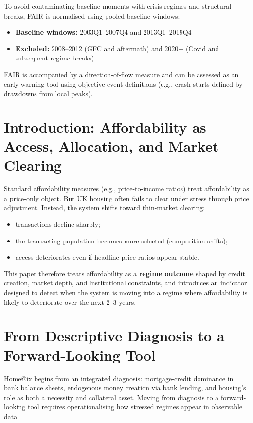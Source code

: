 \documentclass[11pt,a4paper]{article}
\begin{document}
To avoid contaminating baseline moments with crisis regimes and structural breaks, FAIR is normalised using pooled baseline windows:
\begin{itemize}
  \item \textbf{Baseline windows:} 2003Q1--2007Q4 and 2013Q1--2019Q4
  \item \textbf{Excluded:} 2008--2012 (GFC and aftermath) and 2020+ (Covid and subsequent regime breaks)
\end{itemize}

FAIR is accompanied by a direction-of-flow measure and can be assessed as an early-warning tool using objective event definitions (e.g., crash starts defined by drawdowns from local peaks).

\section{Introduction: Affordability as Access, Allocation, and Market Clearing}
Standard affordability measures (e.g., price-to-income ratios) treat affordability as a price-only object. But UK housing often fails to clear under stress through price adjustment. Instead, the system shifts toward thin-market clearing:
\begin{itemize}
  \item transactions decline sharply;
  \item the transacting population becomes more selected (composition shifts);
  \item access deteriorates even if headline price ratios appear stable.
\end{itemize}

This paper therefore treats affordability as a \textbf{regime outcome} shaped by credit creation, market depth, and institutional constraints, and introduces an indicator designed to detect when the system is moving into a regime where affordability is likely to deteriorate over the next 2--3 years.

\section{From Descriptive Diagnosis to a Forward-Looking Tool}
Home@ix begins from an integrated diagnosis: mortgage-credit dominance in bank balance sheets, endogenous money creation via bank lending, and housing’s role as both a necessity and collateral asset. Moving from diagnosis to a forward-looking tool requires operationalising how stressed regimes appear in observable data.
\end{document}
